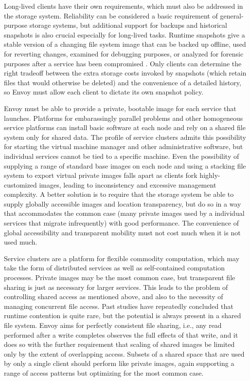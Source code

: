 Long-lived clients have their own requirements, which must also be addressed in the storage system. Reliability can be considered a basic requirement of general-purpose storage systems, but additional support for backups and historical snapshots is also crucial especially for long-lived tasks. Runtime snapshots give a stable version of a changing file system image that can be backed up offline, used for reverting changes, examined for debugging purposes, or analyzed for forensic purposes after a service has been compromised \cite{king,whitaker04}. Only clients can determine the right tradeoff between the extra storage costs invoked by snapshots (which retain files that would otherwise be deleted) and the convenience of a detailed history, so Envoy must allow each client to dictate its own snapshot policy.

Envoy must be able to provide a private, bootable image for each service that launches. Platforms for embarassingly parallel problems and other homogeneous service platforms can install basic software at each node and rely on a shared file system only for shared data. The profile of service clusters admits this possibility for starting the virtual machine manager and other administrative software, but individual services cannot be tied to a specific machine. Even the possibility of supplying a range of standard base images on each node and using a stacking file system to export virtual private images falls apart as clients fork highly-customized images, leading to inconsistency and excessive management complexity. A better solution is to require that the storage system be able to supply globally accessible images and location transparency, but do so in a way that accommodates the common case (many private images used by a individual services that migrate infrequently) with good performance. The convenience of global accessibility and transparent mobility must not cost much when it is not used much.

Service clusters are a platform for flexible commodity computation, which may take the form of distributed services as well as self-contained computation processes. Private images may be the most common case, but transparent file sharing is just as necessary for larger services. This leads to the problem of controlling shared access as mentioned above, and also to the necessity of managing concurrent file access. Past studies have repeatedly concluded that runtime contention is quite rare, but the potential is always present in a shared file system. Envoy aims for perfectly consistent file sharing, i.e., any read performed after a write completes observes the full effects of that write, and it does so with the further requirement that scaling of shared images be limited only by the extent of overlapping access. Subsets of a shared space that are used by only a single client should perform like private images, again supporting a range of access patterns but optimizing for the most common case.

